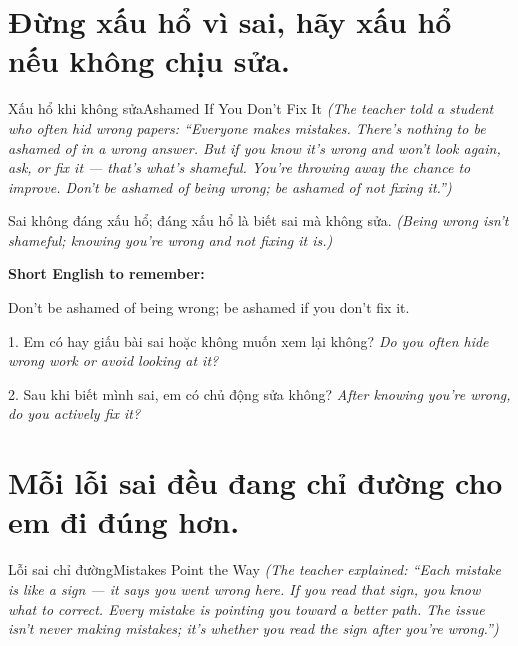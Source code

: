 \section{Đừng xấu hổ vì sai, hãy xấu hổ nếu không chịu sửa.}
\begin{truyen}{Xấu hổ khi không sửa}{Ashamed If You Don't Fix It}
\textit{(The teacher told a student who often hid wrong papers: ``Everyone makes mistakes. There's nothing to be ashamed of in a wrong answer. But if you know it's wrong and won't look again, ask, or fix it — that's what's shameful. You're throwing away the chance to improve. Don't be ashamed of being wrong; be ashamed of not fixing it.'')}
\end{truyen}

\begin{baihoc}
Sai không đáng xấu hổ; đáng xấu hổ là biết sai mà không sửa.
\textit{(Being wrong isn't shameful; knowing you're wrong and not fixing it is.)}
\end{baihoc}

\begin{ghinhoanh}
\textbf{Short English to remember:}

Don't be ashamed of being wrong; be ashamed if you don't fix it.

\end{ghinhoanh}

\begin{tuhocnhanh}
1. Em có hay giấu bài sai hoặc không muốn xem lại không? \textit{Do you often hide wrong work or avoid looking at it?}

2. Sau khi biết mình sai, em có chủ động sửa không? \textit{After knowing you're wrong, do you actively fix it?}
\end{tuhocnhanh}
\ngancach

\section{Mỗi lỗi sai đều đang chỉ đường cho em đi đúng hơn.}
\begin{truyen}{Lỗi sai chỉ đường}{Mistakes Point the Way}
\textit{(The teacher explained: ``Each mistake is like a sign — it says you went wrong here. If you read that sign, you know what to correct. Every mistake is pointing you toward a better path. The issue isn't never making mistakes; it's whether you read the sign after you're wrong.'')}
\end{truyen}

